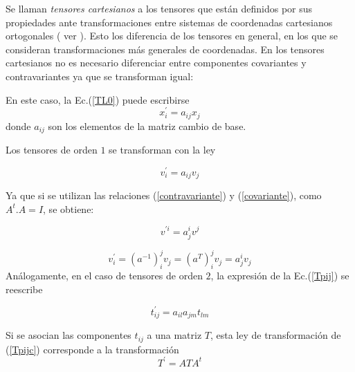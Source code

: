 Se llaman \textit{tensores cartesianos} a los tensores que están definidos por sus propiedades ante transformaciones entre sistemas de coordenadas cartesianos ortogonales ( ver \cite{santalo}). 
Esto los diferencia de los tensores en general, en los que se consideran transformaciones más generales de coordenadas.  
En los tensores cartesianos no es necesario  diferenciar entre componentes covariantes y contravariantes ya que se transforman igual:  

En este caso, la Ec.(\ref{TL0}) puede escribirse 
\begin{equation}
\label{TL0C}
x^{'}_i =  a_{ij}x_{j}
\end{equation}
donde $a_{ij}$ son los elementos de la matriz cambio de base. 

Los tensores de orden $1$ se transforman con la ley 


\begin{equation}
v^{'}_i= a_{ij}v_j
\end{equation}

Ya que si se utilizan las  relaciones (\ref{contravariante}) y (\ref{covariante}), como $A^t.A=I$, se obtiene:

\begin{equation}
v^{'i}= a^{i}_{j}v^{j}
\end{equation}

\begin{equation}
v^{'}_{i}= (a^{-1})^{j}_{i}v_{j}=(a^{T})^{j}_{i}v_{j}=a^{i}_{j}v_{j}
\end{equation}
 Análogamente, en el caso de tensores de orden $2$, la expresión de la Ec.(\ref{Tpij}) se reescribe 
 
\begin{equation}
\label{Tpijc}
t^{'}_{ij} = a_{il}a_{jm}t_{lm}
\end{equation}

Si se asocian las componentes $t_{ij}$ a una matriz $T$, esta ley de transformación de (\ref{Tpijc}) corresponde a la transformación 
\begin{equation}
T^{'} = ATA^t
\end{equation}






